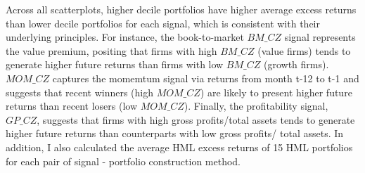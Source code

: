 \documentclass[11pt]{article}
\begin{document}
Across all scatterplots, higher decile portfolios have higher average excess returns than lower decile portfolios for each signal, which is consistent with their underlying principles. For instance, the book-to-market $BM\_CZ$ signal represents the value premium, positing that firms with high $BM\_CZ$ (value firms) tends to generate higher future returns than firms with low $BM\_CZ$ (growth firms). $MOM\_CZ$ captures the momemtum signal via returns from month t-12 to t-1 and suggests that recent winners (high $MOM\_CZ$) are likely to present higher future returns than recent losers (low $MOM\_CZ$). Finally, the profitability signal, $GP\_CZ$, suggests that firms with high gross profits/total assets tends to generate higher future returns than counterparts with low gross profits/ total assets. In addition, I also calculated the average HML excess returns of 15 HML portfolios for each pair of signal - portfolio construction method.  
\end{document}
